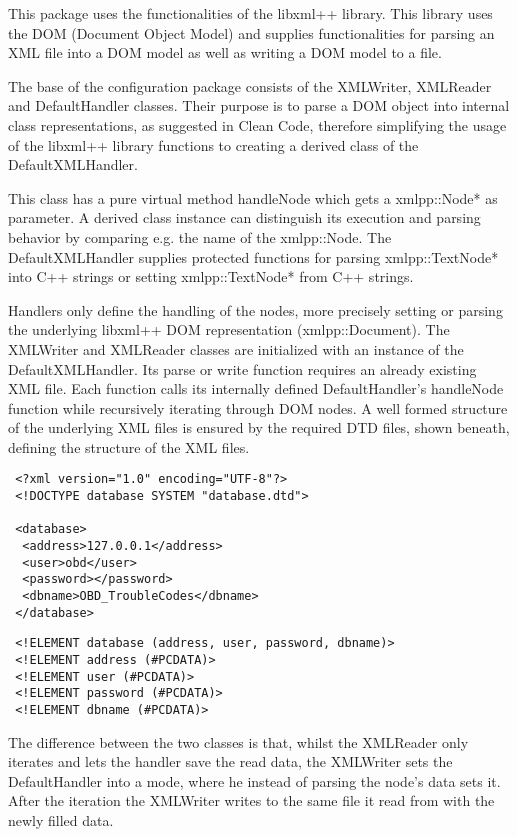 This package uses the functionalities of the libxml++ library. This library uses the DOM (Document Object Model) and supplies functionalities 
for parsing an XML file into a DOM model as well as writing a DOM model to a file. 

The base of the configuration package consists of the XMLWriter, XMLReader and DefaultHandler classes. Their purpose is to parse a DOM object 
into internal class representations, as suggested in Clean Code, therefore simplifying the usage of the libxml++ library functions to creating 
a derived class of the DefaultXMLHandler. 

This class has a pure virtual method handleNode which gets a xmlpp::Node* as parameter. A derived class instance can distinguish its execution 
and parsing behavior by comparing e.g. the name of the xmlpp::Node. The DefaultXMLHandler supplies protected functions for parsing 
xmlpp::TextNode* into C++ strings or setting xmlpp::TextNode* from C++ strings. 

Handlers only define the handling of the nodes, more precisely setting  or parsing the underlying libxml++ DOM representation (xmlpp::Document). 
The XMLWriter and XMLReader classes are initialized with an instance of the DefaultXMLHandler. Its parse or write function requires an already 
existing XML file. Each function calls its internally defined DefaultHandler’s handleNode function while recursively iterating through DOM nodes. 
A well formed structure of the underlying XML files is ensured by the required DTD files, shown beneath, defining the structure of the XML files.

\begin{lstlisting}
 <?xml version="1.0" encoding="UTF-8"?>
 <!DOCTYPE database SYSTEM "database.dtd">

 <database>
  <address>127.0.0.1</address>
  <user>obd</user>
  <password></password>
  <dbname>OBD_TroubleCodes</dbname>
 </database>
\end{lstlisting}

\begin{lstlisting}
 <!ELEMENT database (address, user, password, dbname)>
 <!ELEMENT address (#PCDATA)>
 <!ELEMENT user (#PCDATA)>
 <!ELEMENT password (#PCDATA)>
 <!ELEMENT dbname (#PCDATA)>
\end{lstlisting}

The difference between the two classes is that, whilst the XMLReader only iterates and lets the handler save the read data, the XMLWriter sets 
the DefaultHandler into a mode, where he instead of parsing the node’s data sets it. After the iteration the XMLWriter writes to the same file 
it read from with the newly filled data.
